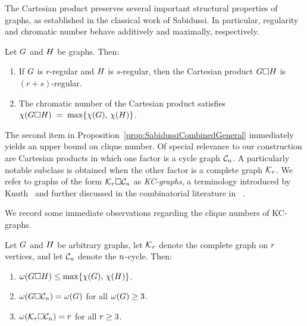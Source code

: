 The Cartesian product preserves several important structural properties of graphs, as established in the classical work of Sabidussi. In particular, regularity and chromatic number behave additively and maximally, respectively.

\begin{proposition}
\label{prop:SabidussiCombinedGeneral}
Let $G$ and $H$ be graphs. Then:
\begin{enumerate}
    \item If $G$ is $r$-regular and $H$ is $s$-regular, then the Cartesian product $G \square H$ is $(r+s)$-regular. \label{GraphProdReg}
    \item The chromatic number of the Cartesian product satisfies $\chi(G \square H) \;=\; \max\{\chi(G),\, \chi(H)\}$. \label{GraphProdChrom}
    
\end{enumerate}
\end{proposition}

The second item in Proposition~\ref{prop:SabidussiCombinedGeneral} immediately yields an upper bound on clique number.
Of special relevance to our construction are Cartesian products in which one factor is a cycle graph $\mathcal{C}_n$. A particularly notable subclass is obtained when the other factor is a complete graph $\mathcal{K}_r$. We refer to graphs of the form $\mathcal{K}_r \square \mathcal{C}_n$ as \emph{KC-graphs}, a terminology introduced by Knuth~\citep{Knuth:TAOCP4F7} and further discussed in the combinatorial literature in ~\citep{Knuth:CoupsGracefulGraphs,MathWorld:KCGraph}.

We record some immediate observations regarding the clique numbers of KC-graphs.

\begin{observation}\label{obs:ProdCliqInvs}
    Let $G$ and $H$ be arbitrary graphs, let $\mathcal{K}_r$ denote the complete graph on $r$ vertices, and let $\mathcal{C}_n$ denote the $n$-cycle. Then:
    \begin{enumerate}
        \item $\omega(G \square H) \leq \max\{\chi(G),\, \chi(H)\}$. \label{ProdCliqInvsGH}
        \item $\omega(G \square \mathcal{C}_n) = \omega(G)$ for all $\omega(G) \geq 3$. \label{ProdCliqInvsGC}
        \item $\omega(\mathcal{K}_r \square \mathcal{C}_n) = r$ for all $r \geq 3$. \label{ProdCliqInvsKC}
    \end{enumerate}
\end{observation}


